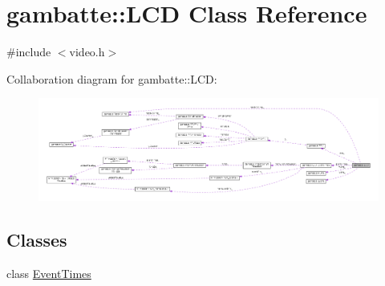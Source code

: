 \hypertarget{classgambatte_1_1LCD}{}\section{gambatte\+:\+:L\+CD Class Reference}
\label{classgambatte_1_1LCD}


{\ttfamily \#include $<$video.\+h$>$}



Collaboration diagram for gambatte\+:\+:L\+CD\+:
\nopagebreak
\begin{figure}[H]
\begin{center}
\leavevmode
\includegraphics[width=350pt]{classgambatte_1_1LCD__coll__graph}
\end{center}
\end{figure}
\subsection*{Classes}
\begin{DoxyCompactItemize}
\item 
class \hyperlink{classgambatte_1_1LCD_1_1EventTimes}{Event\+Times}
\end{DoxyCompactItemize}
